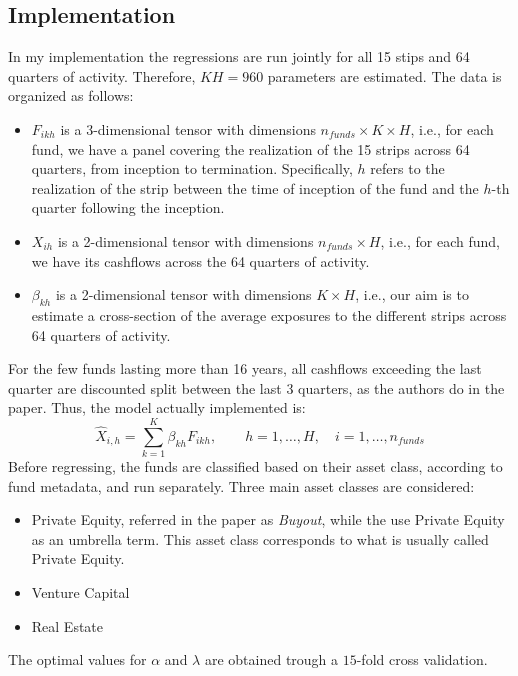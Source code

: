 \documentclass[12pt]{article}
\begin{document}
    \subsection{Implementation}\label{subsec:implementation}
    In my implementation the regressions are run jointly for all 15 stips and 64 quarters of activity.
    Therefore, $KH=960$ parameters are estimated.
    The data is organized as follows:
    \begin{itemize}
        \item $F_{ikh}$ is a 3-dimensional tensor with dimensions $n_{funds} \times K \times H$, i.e., for each fund, we have a panel covering the realization of the 15 strips across 64 quarters, from inception to termination. Specifically, $h$ refers to the realization of the strip between the time of inception of the fund and the $h$-th quarter following the inception.
        \item $X_{ih}$ is a 2-dimensional tensor with dimensions $n_{funds} \times H$, i.e., for each fund, we have its cashflows across the 64 quarters of activity.
        \item $\beta_{kh}$ is a 2-dimensional tensor with dimensions $K \times H$, i.e., our aim is to estimate a cross-section of the average exposures to the different strips across 64 quarters of activity.
    \end{itemize}
    For the few funds lasting more than 16 years, all cashflows exceeding the last quarter are discounted split between the last 3 quarters, as the authors do in the paper.
    Thus, the model actually implemented is:
    \begin{equation}
        \hat X_{i,h} = \sum_{k=1}^K \beta_{kh} F_{ikh} , \qquad h=1,\hdots, H, \quad i = 1, \hdots, n_{funds}
        \label{eq:exposures_2}
    \end{equation}
    Before regressing, the funds are classified based on their asset class, according to fund metadata, and run separately.
    Three main asset classes are considered:
    \begin{itemize}
        \item Private Equity, referred in the paper as \textit{Buyout}, while the use Private Equity as an umbrella term.
        This asset class corresponds to what is usually called Private Equity.
        \item Venture Capital
        \item Real Estate
    \end{itemize}
    The optimal values for $\alpha$ and $\lambda$ are obtained trough a $15$-fold cross validation.
\end{document}
